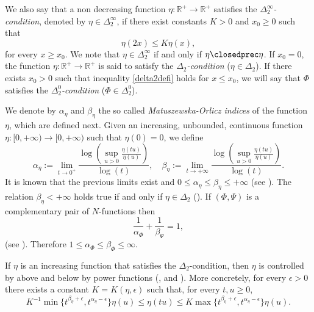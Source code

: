 \documentclass[twoside]{elsarticle}
\theoremstyle{remark}
\renewcommand{\leq}{\leqslant}
\renewcommand{\geq}{\geqslant}
\begin{document}
We also say that a non decreasing function $\eta:\mathbb{R}^+\rightarrow \mathbb{R}^+$ satisfies the  \emph{$\Delta_2^{\infty}$-condition}, denoted by $\eta \in \Delta_2^{\infty}$,
if there exist  constants $K>0$ and  $x_0\geq 0$ such that
\begin{equation}\label{delta2defi}\eta(2x)\leq K\eta(x),
\end{equation}
for every $x\geq x_0$. We note that $\eta \in \Delta_2^{\infty}$ if and only if $\eta\closedprec\eta$.
If $x_0=0$,  the function   $\eta:\mathbb{R}^+\rightarrow \mathbb{R}^+$ is said to satisfy the
\emph{$\Delta_2$-condition} ($\eta \in \Delta_2$).
If there exists $x_0>0$ such that  inequality \eqref{delta2defi} holds for $x\leq x_0$,
we will say that $\Phi$ satisfies the
\emph{$\Delta_2^0$-condition} ($\Phi\in\Delta_2^0$).

We denote by $\alpha_{\eta}$ and $\beta_{\eta}$ the so called  \emph{Matuszewska-Orlicz indices} of the function $\eta$, which are defined next. Given
an increasing, unbounded, continuous function   $\eta:[ 0,+\infty)\to [0,+\infty)$ such that $\eta(0)=0$, we define
\begin{equation}\label{MO_indices}
    \alpha_{\eta}:=\lim\limits_{t\to 0^{+}}\frac{\log \left (\sup\limits_{u>0}\frac{\eta(t u)}{\eta(u)} \right ) }{\log(t)},\quad
    \beta_{\eta}:=\lim\limits_{t\to +\infty}\frac{\log \left  (\sup\limits_{u>0}\frac{\eta(t u)}{\eta(u)}\right )}{\log(t)}.
\end{equation}
It is known that the previous limits exist and  $0\leq \alpha_{\eta}\leq \beta_{\eta}\leq +\infty$
(see \cite[p. 84]{M}). The relation $\beta_{\eta}<+\infty$ holds true if and only if $\eta \in \Delta_2$
(\cite[Thm. 11.7]{M}). If $(\Phi,\Psi)$ is a complementary pair of  $N$-functions then
\begin{equation}\label{compl_ind}
 \frac{1}{\alpha_{\Phi}}+\frac{1}{\beta_{\Psi}}=1,
\end{equation}
(see \cite[Cor. 11.6]{M}). Therefore $1\leq \alpha_{\Phi}\leq\beta_{\Phi}\leq \infty $.

 If $\eta$ is an increasing function that satisfies the $\Delta_2$-condition, then $\eta$ is controlled by above and below
 by power functions (\cite[Sec. 1]{Gustavsson1977}, \cite[Eq. (2.3)-(2.4)]{fiorenza1997indices} and \cite[Thm. 11.13]{M}).   More concretely, for every $\epsilon>0$ there exists a
constant $K=K(\eta,\epsilon)$ such that, for every $t,u\geq 0$,
\begin{equation}\label{delta2-potencias}
    K^{-1}\min\big\{t^{\beta_{\eta}+\epsilon},t^{\alpha_{\eta}-\epsilon} \big\}\eta(u)\leq \eta(t u)\leq
    K\max\big\{t^{\beta_{\eta}+\epsilon},t^{\alpha_{\eta}-\epsilon} \big\}\eta(u).
\end{equation}
\end{document}
